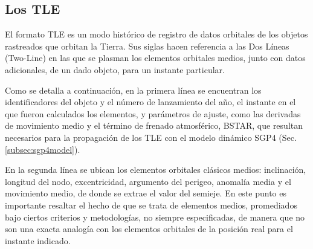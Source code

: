 {\subsection{Los TLE}{\label{subsec:tleformat}}

El formato TLE es un modo hist\'orico de registro de datos orbitales de los objetos rastreados que orbitan la Tierra. Sus siglas  hacen referencia a las Dos L\'ineas (Two-Line) en las que se plasman los elementos orbitales medios, junto con datos adicionales, de un dado objeto, para un instante particular.

Como se detalla a continuación, en la primera l\'inea se encuentran los identificadores del objeto y el n\'umero de lanzamiento del año, el instante en el que fueron calculados los elementos, y parámetros de ajuste, como las derivadas de movimiento medio y el t\'ermino de frenado atmosf\'erico, BSTAR, que resultan necesarios para la propagación de los TLE con el modelo dinámico SGP4 (Sec. \ref{subsec:sgp4model}).

En la segunda l\'inea se ubican los elementos orbitales cl\'asicos medios: inclinaci\'on, longitud del nodo, excentricidad, argumento del perigeo, anomal\'ia media y el movimiento medio, de donde se extrae el valor del semieje. En este punto es importante resaltar el hecho de que se trata de elementos medios, promediados bajo ciertos criterios y metodologías, no siempre especificadas, de manera que no son una exacta analog\'ia con los elementos orbitales de la posici\'on real para el instante indicado.


\begin{center}
\end{center}}
